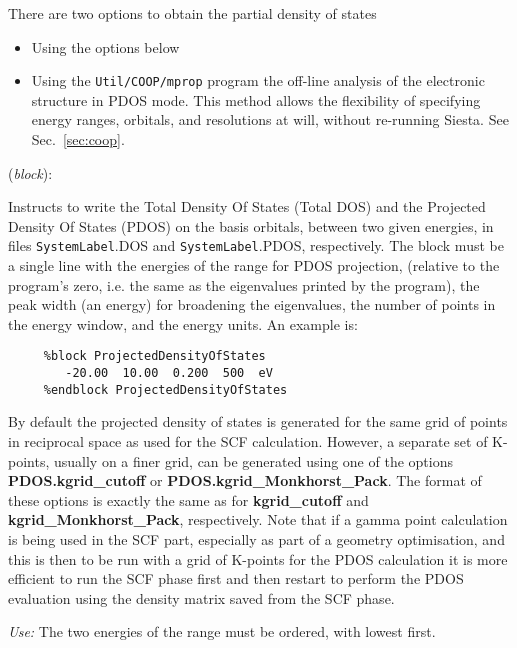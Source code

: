 \documentclass[11pt]{article}
\begin{document}
There are two options to obtain the partial density of states
\begin{itemize}
\item Using the options below
\item Using the {\tt Util/COOP/mprop} program the off-line analysis of
  the electronic structure in PDOS mode. This method allows the
  flexibility of specifying energy ranges, orbitals, and resolutions
  at will, without re-running {\sc Siesta}. See Sec.~\ref{sec:coop}.
\end{itemize}

\begin{description}
\itemsep 10pt
\parsep 0pt
\item[{\bf ProjectedDensityOfStates}] ({\it block}):

Instructs to write the Total Density Of States (Total DOS) and the
Projected Density Of States (PDOS) on the basis orbitals,
between two given energies,
in files {\tt SystemLabel}.DOS and
{\tt SystemLabel}.PDOS, respectively.
The block must be a single line with the energies of the range for
PDOS projection,
(relative to the program's zero, i.e. the same as the eigenvalues
printed by the program), the peak width (an energy) for broadening
the eigenvalues, the number of points in the energy window,
and the energy units.
An example is:

\begin{verbatim}
     %block ProjectedDensityOfStates
        -20.00  10.00  0.200  500  eV
     %endblock ProjectedDensityOfStates
\end{verbatim}

By default the projected density of states is generated for the same
grid of points in reciprocal space as used for the SCF calculation.
However, a separate set of K-points, usually on a finer grid, can
be generated using one of the options \textbf{PDOS.kgrid\_cutoff} or
\textbf{PDOS.kgrid\_Monkhorst\_Pack}. The format of these options is
exactly the same as for \textbf{kgrid\_cutoff} and
\textbf{kgrid\_Monkhorst\_Pack}, respectively. Note that if a gamma
point calculation is being used in the SCF part, especially as part
of a geometry optimisation, and this is then to
be run with a grid of K-points for the PDOS calculation it is more
efficient to run the SCF phase first and then restart to perform the
PDOS evaluation using the density matrix saved from the SCF phase.

{\it Use:} The two energies of the range must be ordered, with lowest
first.


\end{description}
\end{document}
